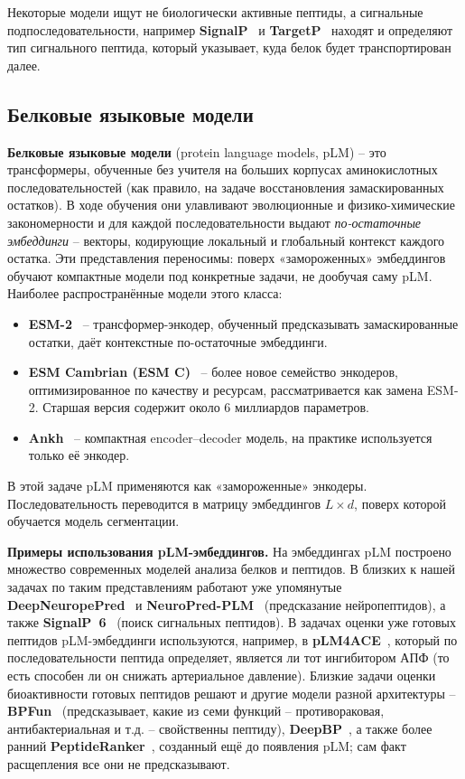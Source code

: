 \documentclass{article}
\begin{document}
Некоторые модели ищут не биологически активные пептиды, а сигнальные подпоследовательности, например \textbf{SignalP}~\cite{teufel2022signalp6} и \textbf{TargetP}~\cite{almagro2019targetp} находят и определяют тип сигнального пептида, который указывает, куда белок будет транспортирован далее.

\subsection{Белковые языковые модели}\label{sec:plm}
\textbf{Белковые языковые модели} (protein language models, pLM) -- это трансформеры, обученные без учителя на больших корпусах аминокислотных последовательностей (как правило, на задаче восстановления замаскированных остатков). В ходе обучения они улавливают эволюционные и физико-химические закономерности и для каждой последовательности выдают \emph{по-остаточные эмбеддинги} -- векторы, кодирующие локальный и глобальный контекст каждого остатка. Эти представления переносимы: поверх «замороженных» эмбеддингов обучают компактные модели под конкретные задачи, не дообучая саму pLM. Наиболее распространённые модели этого класса:
\begin{itemize}
  \item \textbf{ESM-2}~\cite{esm2_2019} -- трансформер-энкодер, обученный предсказывать замаскированные остатки, даёт контекстные по-остаточные эмбеддинги.
  \item \textbf{ESM Cambrian (ESM C)}~\cite{esm_cambrian_blog_2024} -- более новое семейство энкодеров, оптимизированное по качеству и ресурсам, рассматривается как замена ESM-2. Старшая версия содержит около 6 миллиардов параметров.
  \item \textbf{Ankh}~\cite{ankh2023} -- компактная encoder--decoder модель, на практике используется только её энкодер.
\end{itemize}
В этой задаче pLM применяются как «замороженные» энкодеры. Последовательность переводится в матрицу эмбеддингов $L \times d$, поверх которой обучается модель сегментации.

\textbf{Примеры использования pLM-эмбеддингов.} На эмбеддингах pLM построено множество современных моделей анализа белков и пептидов. В близких к нашей задачах по таким представлениям работают уже упомянутые \textbf{DeepNeuropePred}~\cite{wang2024deepneuropepred} и \textbf{NeuroPred-PLM}~\cite{wang2023neuropredplm} (предсказание нейропептидов), а также \textbf{SignalP~6}~\cite{teufel2022signalp6} (поиск сигнальных пептидов). В задачах оценки уже готовых пептидов pLM-эмбеддинги используются, например, в \textbf{pLM4ACE}~\cite{du2024plm4ace}, который по последовательности пептида определяет, является ли тот ингибитором АПФ (то есть способен ли он снижать артериальное давление). Близкие задачи оценки биоактивности готовых пептидов решают и другие модели разной архитектуры -- \textbf{BPFun}~\cite{bpfun2025} (предсказывает, какие из семи функций -- противораковая, антибактериальная и т.д. -- свойственны пептиду), \textbf{DeepBP}~\cite{zhang2024deepbp}, а также более ранний \textbf{PeptideRanker}~\cite{mooney2012peptideranker}, созданный ещё до появления pLM; сам факт расщепления все они не предсказывают.
\end{document}
